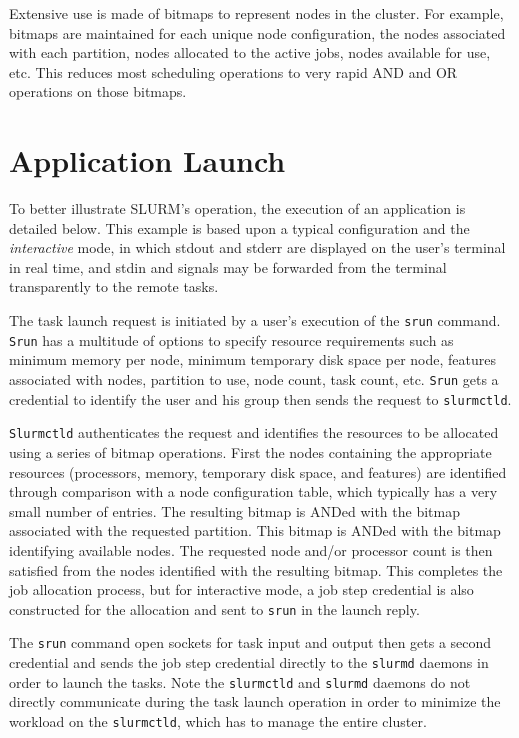 \documentclass[10pt,onecolumn,times]{../common/llncs}
\begin{document}
{Extensive use is made of bitmaps to represent nodes in the cluster. 
For example, bitmaps are maintained for each unique node configuration, 
the nodes associated with each partition, nodes allocated to 
the active jobs, nodes available for use, etc. This reduces most 
scheduling operations to very rapid AND and OR operations on those bitmaps.

\section{Application Launch}

To better illustrate SLURM's operation, the execution of an 
application is detailed below.
This example is based upon a typical configuration and the 
{\em interactive} mode, in which stdout and
stderr are displayed on the user's terminal in real time, and stdin and
signals may be forwarded from the terminal transparently to the remote
tasks.

The task launch request is initiated by a user's execution of the 
{\tt srun} command. {\tt Srun} has a multitude of options to specify 
resource requirements such as minimum memory per node, minimum 
temporary disk space per node, features associated with nodes, 
partition to use, node count, task count, etc.
{\tt Srun} gets a credential to identify the user and his group 
then sends the request to {\tt slurmctld}. 

{\tt Slurmctld} authenticates the request and identifies the resources 
to be allocated using a series of bitmap operations.
First the nodes containing the appropriate resources (processors, 
memory, temporary disk space, and features) are identified through 
comparison with a node configuration table, which typically has 
a very small number of entries. 
The resulting bitmap is ANDed with the bitmap associated with the 
requested partition. 
This bitmap is ANDed with the bitmap identifying available nodes. 
The requested node and/or processor count is then satisfied from 
the nodes identified with the resulting bitmap.
This completes the job allocation process, but for interactive 
mode, a job step credential is also constructed for the allocation 
and sent to {\tt srun} in the launch reply.

The {\tt srun} command open sockets for task input and output then
gets a second credential and sends the job step credential directly 
to the {\tt slurmd} daemons in order to launch the tasks.
Note the {\tt slurmctld} and {\tt slurmd} daemons do not directly 
communicate during the task launch operation in order to minimize the 
workload on the {\tt slurmctld}, which has to manage the entire 
cluster.

}
\end{document}
